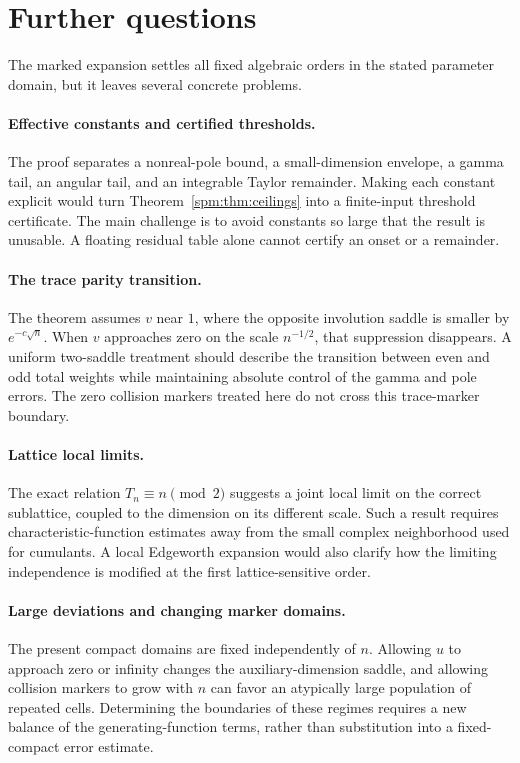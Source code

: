\section{Further questions}\label{spm:sec:outlook}
The marked expansion settles all fixed algebraic orders in the stated parameter domain, but it leaves several concrete problems.

\paragraph{Effective constants and certified thresholds.}
The proof separates a nonreal-pole bound, a small-dimension envelope, a gamma tail, an angular tail, and an integrable Taylor remainder. Making each constant explicit would turn Theorem~\ref{spm:thm:ceilings} into a finite-input threshold certificate. The main challenge is to avoid constants so large that the result is unusable. A floating residual table alone cannot certify an onset or a remainder.

\paragraph{The trace parity transition.}
The theorem assumes $v$ near $1$, where the opposite involution saddle is smaller by $e^{-c\sqrt n}$. When $v$ approaches zero on the scale $n^{-1/2}$, that suppression disappears. A uniform two-saddle treatment should describe the transition between even and odd total weights while maintaining absolute control of the gamma and pole errors. The zero collision markers treated here do not cross this trace-marker boundary.

\paragraph{Lattice local limits.}
The exact relation $T_n\equiv n\pmod2$ suggests a joint local limit on the correct sublattice, coupled to the dimension on its different scale. Such a result requires characteristic-function estimates away from the small complex neighborhood used for cumulants. A local Edgeworth expansion would also clarify how the limiting independence is modified at the first lattice-sensitive order.

\paragraph{Large deviations and changing marker domains.}
The present compact domains are fixed independently of $n$. Allowing $u$ to approach zero or infinity changes the auxiliary-dimension saddle, and allowing collision markers to grow with $n$ can favor an atypically large population of repeated cells. Determining the boundaries of these regimes requires a new balance of the generating-function terms, rather than substitution into a fixed-compact error estimate.

